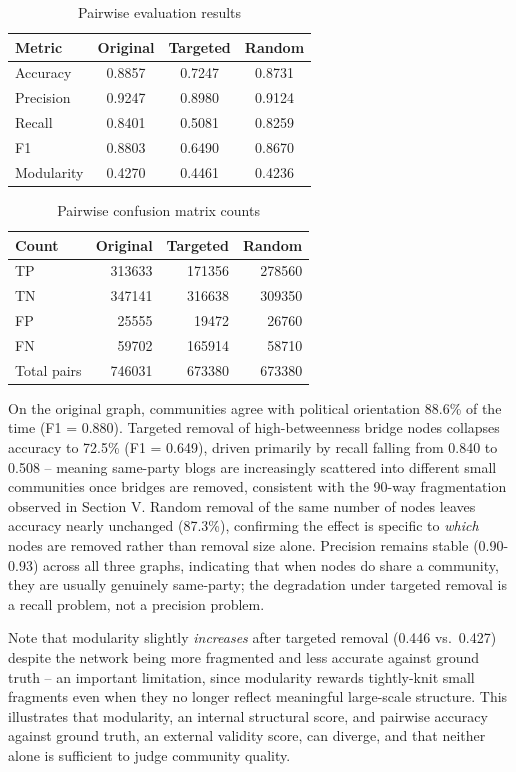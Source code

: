 \documentclass[conference]{IEEEtran}
\begin{document}
\begin{table}[htbp]
\caption{Pairwise evaluation results}
\label{tab:confusion}
\centering
\begin{tabular}{@{}lccc@{}}
\toprule
Metric & Original & Targeted & Random \\
\midrule
Accuracy & 0.8857 & 0.7247 & 0.8731 \\
Precision & 0.9247 & 0.8980 & 0.9124 \\
Recall & 0.8401 & 0.5081 & 0.8259 \\
F1 & 0.8803 & 0.6490 & 0.8670 \\
Modularity & 0.4270 & 0.4461 & 0.4236 \\
\bottomrule
\end{tabular}
\end{table}

\begin{table}[htbp]
\caption{Pairwise confusion matrix counts}
\label{tab:pairwise-counts}
\centering
\begin{tabular}{@{}lrrr@{}}
\toprule
Count & Original & Targeted & Random \\
\midrule
TP & 313633 & 171356 & 278560 \\
TN & 347141 & 316638 & 309350 \\
FP & 25555 & 19472 & 26760 \\
FN & 59702 & 165914 & 58710 \\
Total pairs & 746031 & 673380 & 673380 \\
\bottomrule
\end{tabular}
\end{table}

On the original graph, communities agree with political orientation 88.6\% of the time (F1 = 0.880). Targeted removal of high-betweenness bridge nodes collapses accuracy to 72.5\% (F1 = 0.649), driven primarily by recall falling from 0.840 to 0.508 -- meaning same-party blogs are increasingly scattered into different small communities once bridges are removed, consistent with the 90-way fragmentation observed in Section V. Random removal of the same number of nodes leaves accuracy nearly unchanged (87.3\%), confirming the effect is specific to \emph{which} nodes are removed rather than removal size alone. Precision remains stable (0.90-0.93) across all three graphs, indicating that when nodes do share a community, they are usually genuinely same-party; the degradation under targeted removal is a recall problem, not a precision problem.

Note that modularity slightly \emph{increases} after targeted removal (0.446 vs.\ 0.427) despite the network being more fragmented and less accurate against ground truth -- an important limitation, since modularity rewards tightly-knit small fragments even when they no longer reflect meaningful large-scale structure. This illustrates that modularity, an internal structural score, and pairwise accuracy against ground truth, an external validity score, can diverge, and that neither alone is sufficient to judge community quality.
\end{document}
